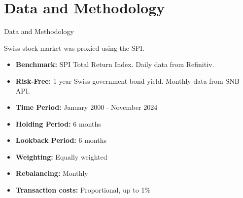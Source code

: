 \documentclass[10pt]{beamer}
\begin{document}
\section{Data and Methodology}
\begin{frame}[fragile]{Data and Methodology}

\noindent %
\begin{minipage}[t]{0.45\textwidth} %
    \begin{tcolorbox}[colframe=datagreen, colback=boxbg, coltitle=white, title=Data, sharp corners=all, fonttitle=\bfseries, left=2mm, right=2mm, enhanced, height=6cm]
        Swiss stock market was proxied using the SPI. 
        \begin{itemize}
            \item \textbf{Benchmark:} SPI Total Return Index. Daily data from Refinitiv.
            \item \textbf{Risk-Free:} 1-year Swiss government bond yield. Monthly data from SNB API.
            \item \textbf{Time Period:} January 2000 - November 2024
        \end{itemize}
    \end{tcolorbox}
\end{minipage}%
\hspace{0.05\textwidth} %
\begin{minipage}[t]{0.45\textwidth} %
    \begin{tcolorbox}[colframe=strategyblue, colback=boxbg, coltitle=white, title=Methodology, sharp corners=all, fonttitle=\bfseries, left=2mm, right=2mm, enhanced, height=6cm]
        \begin{itemize}
            \item \textbf{Holding Period:} 6 months
            \item \textbf{Lookback Period:} 6 months
            \item \textbf{Weighting:} Equally weighted
            \item \textbf{Rebalancing:} Monthly
            \item \textbf{Transaction costs:} Proportional, up to 1\%
            
        \end{itemize}
    \end{tcolorbox}
\end{minipage}

\end{frame}
\end{document}
